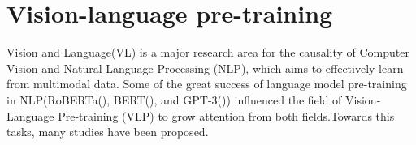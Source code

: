 


\section{Vision-language pre-training}

Vision and Language(VL) is a major research area for the causality of Computer Vision and Natural Language Processing (NLP), which aims to effectively learn from multimodal data. Some of the great success of language model pre-training in NLP(RoBERTa(\cite{liu2020roberta}), BERT(\cite{devlin2018bert}), and GPT-3(\cite{brown2020language})) influenced the field of Vision-Language Pre-training (VLP) to grow attention from both fields.Towards this tasks, many studies have been proposed.


